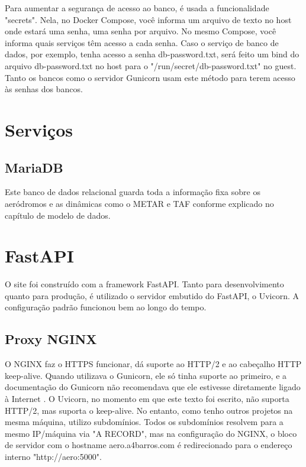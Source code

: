 Para aumentar a segurança de acesso ao banco, é usada a funcionalidade "secrets". Nela, no Docker Compose,
você informa um arquivo de texto no host onde estará uma senha, uma senha por arquivo. No mesmo Compose,
você informa quais serviços têm acesso a cada senha. Caso o serviço de banco de dados, por exemplo, tenha
acesso a senha db-password.txt, será feito um bind do arquivo db-password.txt no host para o "/run/secret/db-password.txt"
no guest.
Tanto os bancos como o servidor Gunicorn usam este método para terem acesso às senhas dos bancos.

\section{Serviços}

\subsection{MariaDB}
Este banco de dados relacional guarda toda a informação fixa sobre os aeródromos e as dinâmicas
como o METAR e TAF conforme explicado no capítulo de modelo de dados.

\section{FastAPI}

O site foi construído com a framework FastAPI. Tanto para desenvolvimento quanto para produção, 
é utilizado o servidor embutido do FastAPI, o Uvicorn. A configuração padrão funcionou bem ao
longo do tempo.

\subsection{Proxy NGINX}
O NGINX faz o HTTPS funcionar, dá suporte ao HTTP/2 e ao cabeçalho HTTP keep-alive. Quando
utilizava o Gunicorn, ele só tinha suporte ao primeiro, e a documentação do Gunicorn não
recomendava que ele estivesse diretamente ligado à Internet \cite{nginx-gunicorn}. O Uvicorn,
no momento em que este texto foi escrito, não suporta HTTP/2, mas suporta o keep-alive. No
entanto, como tenho outros projetos na mesma máquina, utilizo subdomínios. Todos os subdomínios
resolvem para a mesmo IP/máquina via "A RECORD", mas na configuração
do NGINX, o bloco de servidor com o hostname aero.a4barros.com é redirecionado para o
endereço interno "http://aero:5000".



